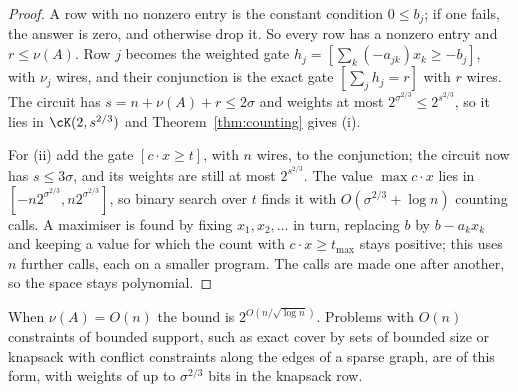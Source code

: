 \begin{proof}
A row with no nonzero entry is the constant condition $0\le b_j$; if one fails,
the answer is zero, and otherwise drop it. So every row has a nonzero entry and
$r\le\nu(A)$. Row $j$ becomes the weighted gate
$h_j=[\sum_k(-a_{jk})x_k\ge-b_j]$, with $\nu_j$ wires, and their conjunction is the
exact gate $[\sum_jh_j=r]$ with $r$ wires. The circuit has $s=n+\nu(A)+r\le2\sigma$
and weights at most $2^{\sigma^{2/3}}\le2^{s^{2/3}}$, so it lies in
$\cK(2,s^{2/3})$ and Theorem~\ref{thm:counting} gives (i).

For (ii) add the gate $[c\cdot x\ge t]$, with $n$ wires, to the conjunction; the
circuit now has $s\le3\sigma$, and its weights are still at most
$2^{s^{2/3}}$. The value $\max c\cdot x$ lies in $[-n2^{\sigma^{2/3}},
n2^{\sigma^{2/3}}]$, so binary search over $t$ finds it with
$O(\sigma^{2/3}+\log n)$ counting calls. A maximiser is found by fixing
$x_1,x_2,\dots$ in turn, replacing $b$ by $b-a_kx_k$ and keeping a value for which
the count with $c\cdot x\ge t_{\max}$ stays positive; this uses $n$ further calls,
each on a smaller program. The calls are made one after another, so the space
stays polynomial.
\end{proof}

When $\nu(A)=O(n)$ the bound is $2^{O(n/\sqrt{\log n})}$. Problems with $O(n)$
constraints of bounded support, such as exact cover by sets of bounded size or
knapsack with conflict constraints along the edges of a sparse graph, are of
this form, with weights of up to $\sigma^{2/3}$ bits in the knapsack row.
